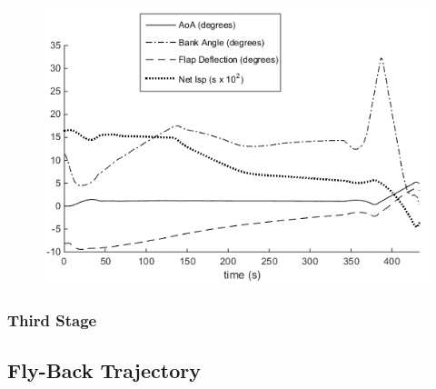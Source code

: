 \documentclass[journal]{new-aiaa} %
\begin{document}
\begin{figure}
	\centering
	\includegraphics[width=0.7\linewidth]{Figures/AscentVehicle}
	\caption{}
	\label{fig:ascentvehicle}
\end{figure}


\subsubsection{Third Stage}

\subsection{Fly-Back Trajectory}
 
\end{document}

